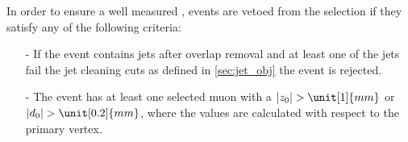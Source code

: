In order to ensure a well measured \MET, events are vetoed from the
selection if they satisfy any of the following criteria:

\begin{itemize}\itemsep0.1cm
\item[-] If the event contains jets after overlap removal and at least one of the jets fail the
  jet cleaning cuts as defined in \Sec \ref{sec:jet_obj} the event
  is rejected.
\item[-] The event has at least one selected muon with a $|z_{0}| >
  \unit[1]{mm}$ or $|d_0| > \unit[0.2]{mm}$, where the values are
  calculated with respect to the primary vertex.
\end{itemize}
